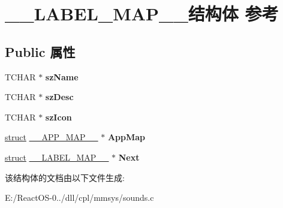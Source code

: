 \hypertarget{struct_____l_a_b_e_l___m_a_p____}{}\section{\+\_\+\+\_\+\+L\+A\+B\+E\+L\+\_\+\+M\+A\+P\+\_\+\+\_\+结构体 参考}
\label{struct_____l_a_b_e_l___m_a_p____}
\subsection*{Public 属性}
\begin{DoxyCompactItemize}
\item 
\mbox{\label{struct_____l_a_b_e_l___m_a_p_____ab516dd5b28520f94e23b47bc0a5a45c8}} 
T\+C\+H\+AR $\ast$ {\bfseries sz\+Name}
\item 
\mbox{\label{struct_____l_a_b_e_l___m_a_p_____a1580ece0488331bf4a8f7c5d1a8f3506}} 
T\+C\+H\+AR $\ast$ {\bfseries sz\+Desc}
\item 
\mbox{\label{struct_____l_a_b_e_l___m_a_p_____a0b1a962eb39bc6c1fc1d10e6c399c305}} 
T\+C\+H\+AR $\ast$ {\bfseries sz\+Icon}
\item 
\mbox{\label{struct_____l_a_b_e_l___m_a_p_____a12213d4f3415308727908dab04d56765}} 
\hyperlink{interfacestruct}{struct} \hyperlink{struct_____a_p_p___m_a_p____}{\+\_\+\+\_\+\+A\+P\+P\+\_\+\+M\+A\+P\+\_\+\+\_\+} $\ast$ {\bfseries App\+Map}
\item 
\mbox{\label{struct_____l_a_b_e_l___m_a_p_____a83a8049b841e7892b59d6dc5e4a7912d}} 
\hyperlink{interfacestruct}{struct} \hyperlink{struct_____l_a_b_e_l___m_a_p____}{\+\_\+\+\_\+\+L\+A\+B\+E\+L\+\_\+\+M\+A\+P\+\_\+\+\_\+} $\ast$ {\bfseries Next}
\end{DoxyCompactItemize}


该结构体的文档由以下文件生成\+:\begin{DoxyCompactItemize}
\item 
E\+:/\+React\+O\+S-\/0../dll/cpl/mmsys/sounds.\+c\end{DoxyCompactItemize}
